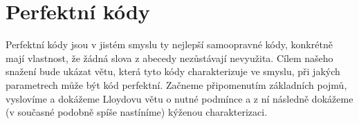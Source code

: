 \documentclass[a4paper,12pt,titlepage]{article}
\begin{document}
\section{Perfektní kódy}

Perfektní kódy jsou v jistém smyslu ty nejlepší samoopravné kódy, konkrétně mají vlastnost, že žádná slova z abecedy nezůstávají nevyužita. Cílem našeho snažení bude ukázat větu, která tyto kódy charakterizuje ve smyslu, při jakých parametrech může být kód perfektní. Začneme připomenutím základních pojmů, vyslovíme a dokážeme Lloydovu větu o nutné podmínce a z ní následně dokážeme (v současné podobně spíše nastíníme) kýženou charakterizaci.

\medskip







\end{document}
